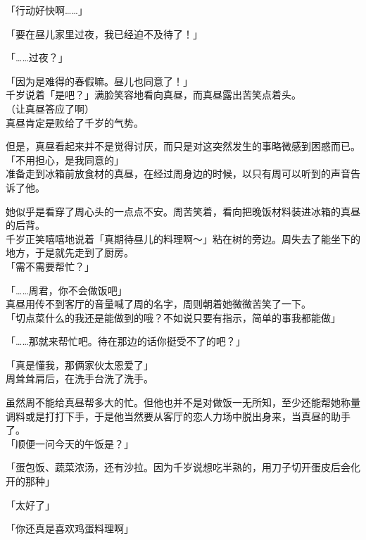 「行动好快啊……」

「要在昼儿家里过夜，我已经迫不及待了！」

「……过夜？」

「因为是难得的春假嘛。昼儿也同意了！」\\

千岁说着「是吧？」满脸笑容地看向真昼，而真昼露出苦笑点着头。\\

（让真昼答应了啊）\\

真昼肯定是败给了千岁的气势。

但是，真昼看起来并不是觉得讨厌，而只是对这突然发生的事略微感到困惑而已。\\

「不用担心，是我同意的」\\

准备走到冰箱前放食材的真昼，在经过周身边的时候，以只有周可以听到的声音告诉了他。

她似乎是看穿了周心头的一点点不安。周苦笑着，看向把晚饭材料装进冰箱的真昼的后背。\\

千岁正笑嘻嘻地说着「真期待昼儿的料理啊～」粘在树的旁边。周失去了能坐下的地方，于是就先走到了厨房。\\

「需不需要帮忙？」

「……周君，你不会做饭吧」\\

真昼用传不到客厅的音量喊了周的名字，周则朝着她微微苦笑了一下。\\

「切点菜什么的我还是能做到的哦？不如说只要有指示，简单的事我都能做」

「……那就来帮忙吧。待在那边的话你挺受不了的吧？」

「真是懂我，那俩家伙太恩爱了」\\

周耸耸肩后，在洗手台洗了洗手。

虽然周不能给真昼帮多大的忙。但他也并不是对做饭一无所知，至少还能帮她称量调料或是打打下手，于是他当然要从客厅的恋人力场中脱出身来，当真昼的助手了。\\

「顺便一问今天的午饭是？」

「蛋包饭、蔬菜浓汤，还有沙拉。因为千岁说想吃半熟的，用刀子切开蛋皮后会化开的那种」

「太好了」

「你还真是喜欢鸡蛋料理啊」

